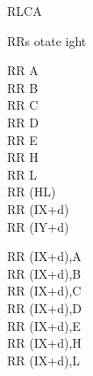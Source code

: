 \begin{basedescript}{
	\desclabelstyle{\multilinelabel}
	\desclabelwidth{3cm}}
\begin{DetailItem}{RLCA}{}
		\begin{DetailEffectsFlags}
		\end{DetailEffectsFlags}

		\begin{DetailTiming}
		\end{DetailTiming}

	\end{DetailItem}





	\begin{DetailItem}{RR}{s}
		{otate ight}
		{}

		\begin{DetailVariants}
			RR A\\
			RR B\\
			RR C\\
			RR D\\
			RR E\\
			RR H\\
			RR L\\
			RR (HL)\\
			RR (IX+d)\\
			RR (IY+d)

			\columnbreak
			RR (IX+d),A\UNDOC\\
			RR (IX+d),B\UNDOC\\
			RR (IX+d),C\UNDOC\\
			RR (IX+d),D\UNDOC\\
			RR (IX+d),E\UNDOC\\
			RR (IX+d),H\UNDOC\\
			RR (IX+d),L\UNDOC


\end{DetailVariants}
\end{DetailItem}
\end{basedescript}
